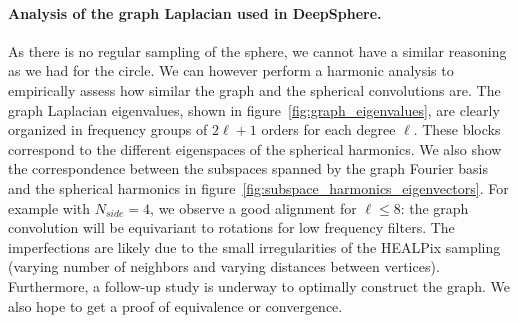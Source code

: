 \documentclass{article} %
\newcommand{\figref}[1]{figure~\ref{fig:#1}}
\renewcommand{\b}[1]{{\bm{#1}}}   %
\newcommand{\1}{\b{1}}              %
\newcommand{\0}{\b{0}}              %
\renewcommand{\L}{\b{L}}
\newcommand{\todo}[1]{{\color[rgb]{.6,.1,.6}{#1}}}
\begin{document}
\paragraph{Analysis of the graph Laplacian used in DeepSphere.}
As there is no regular sampling of the sphere, we cannot have a similar reasoning as we had for the circle.
We can however perform a harmonic analysis to empirically assess how similar the graph and the spherical convolutions are.
The graph Laplacian eigenvalues, shown in \figref{graph_eigenvalues}, are clearly organized in frequency groups of $2\ell + 1$ orders for each degree $\ell$.
These blocks correspond to the different eigenspaces of the spherical harmonics.
We also show the correspondence between the subspaces spanned by the graph Fourier basis and the spherical harmonics in \figref{subspace_harmonics_eigenvectors}.
For example with $N_{side}=4$, we observe a good alignment for $\ell \leq 8$: the graph convolution will be equivariant to rotations for low frequency filters.
The imperfections are likely due to the small irregularities of the HEALPix sampling (varying number of neighbors and varying distances between vertices).
Furthermore, a follow-up study is underway to optimally construct the graph.
We also hope to get a proof of equivalence or convergence.


\end{document}
